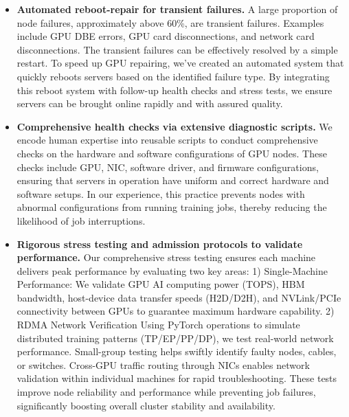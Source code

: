 \begin{itemize}[left=0cm]
    \item \textbf{Automated reboot-repair for transient failures.}
    A large proportion of node failures, approximately above 60\%, are transient failures. Examples include GPU DBE errors, GPU card disconnections, and network card disconnections. The transient failures can be effectively resolved by a simple restart. To speed up GPU repairing, we've created an automated system that quickly reboots servers based on the identified failure type. By integrating this reboot system with follow-up health checks and stress tests, we ensure servers can be brought online rapidly and with assured quality.
    
    \item \textbf{Comprehensive health checks via extensive diagnostic scripts.}
    We encode human expertise into reusable scripts to conduct comprehensive checks on the hardware and software configurations of GPU nodes. These checks include GPU, NIC, software driver, and firmware configurations, ensuring that servers in operation have uniform and correct hardware and software setups. In our experience, this practice prevents nodes with abnormal configurations from running training jobs, thereby reducing the likelihood of job interruptions.
    
    \item \textbf{Rigorous stress testing and admission protocols to validate performance.}
    Our comprehensive stress testing ensures each machine delivers peak performance by evaluating two key areas:
    1) Single-Machine Performance: 
    We validate GPU AI computing power (TOPS), HBM bandwidth, host-device data transfer speeds (H2D/D2H), and NVLink/PCIe connectivity between GPUs to guarantee maximum hardware capability.
    2) RDMA Network Verification
    Using PyTorch operations to simulate distributed training patterns (TP/EP/PP/DP), we test real-world network performance. Small-group testing helps swiftly identify faulty nodes, cables, or switches. Cross-GPU traffic routing through NICs enables network validation within individual machines for rapid troubleshooting.
    These tests improve node reliability and performance while preventing job failures, significantly boosting overall cluster stability and availability.


\end{itemize}






